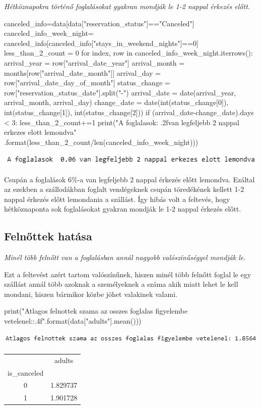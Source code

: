 \textit{Hétköznapokra történő foglalásokat gyakran mondják le 1-2 nappal érkezés előtt.}
\begin{python}
canceled_info=data[data["reservation_status"]=="Canceled"]
canceled_info_week_night=
canceled_info[canceled_info["stays_in_weekend_nights"]==0]
less_than_2_count = 0
for index, row in canceled_info_week_night.iterrows():
    arrival_year = row["arrival_date_year"]
    arrival_month = months[row["arrival_date_month"]]
    arrival_day = row["arrival_date_day_of_month"]
    status_change = row["reservation_status_date"].split("-")
    arrival_date = date(arrival_year, arrival_month, arrival_day)
    change_date = date(int(status_change[0]), int(status_change[1]),
    int(status_change[2]))
    if (arrival_date-change_date).days < 3:
        less_than_2_count+=1
print("A foglalasok{: .2f}van legfeljebb 2 nappal erkezes elott lemondva"
.format(less_than_2_count/len(canceled_info_week_night)))
\end{python}
\includegraphics{images/4.fejezet/3.adatelemzes3.PNG}

Csupán a foglalások 6\%-a van legfeljebb 2 nappal érkezés előtt lemondva.  Ezáltal az ezekben a szállodákban foglalt vendégeknek csupán töredékének kellett 1-2 nappal érkezés előtt lemondania a szállást. Így hibás volt a feltevés, hogy hétköznaponta sok foglalásokat gyakran mondják le 1-2 nappal érkezés előtt.

\subsection{Felnőttek hatása}
\textit{Minél több felnőtt van a foglalásban annál nagyobb valószínűséggel mondják le.}

Ezt a feltevést azért tartom valószínűnek, hiszen minél több felnőtt foglal le egy szállást annál több azoknak a személyeknek a száma akik miatt lehet le kell mondani, hiszen bármikor közbe jöhet valakinek valami.
\begin{python}
print("Atlagos felnottek szama az osszes foglalas figyelembe 
vetelenel:{:.4f}".format(data["adults"].mean()))
\end{python}

\includegraphics{images/4.fejezet/3.adatelemzes4.PNG}

\begin{center}
\begin{tabular}{ c c  }
  & adults \\ 
 is\_canceled &  \\  
  0 & 1.829737 \\
  1 & 1.901728
\end{tabular}
\end{center}


